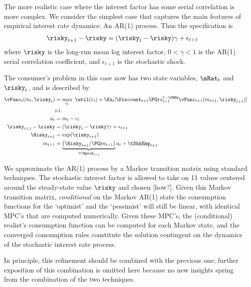 The more realistic case where the interest factor has some serial correlation is more complex.  We consider
the simplest case that captures the main features of empirical interest rate dynamics: An AR(1) process.  Thus
the specification is
\begin{equation}\begin{gathered}\begin{aligned}
  \risky_{t+1}-\risky  & = (\risky_{t}-\risky) \gamma + \epsilon_{t+1}
\end{aligned}\end{gathered}\end{equation}
where $\risky$ is the long-run mean log interest factor, $0 < \gamma < 1$ is the AR(1) serial correlation
coefficient, and $\epsilon_{t+1}$ is the stochastic shock.

The consumer's problem in this case now has two state variables, $\mRat_{t}$ and $\risky_{t}$, and
is described by
\begin{equation}\begin{gathered}\begin{aligned}
        \vFunc_{t}(m_{t},\risky_{t})  & = \max_{{c}_{t}} ~ \util(c_{t})+
        \Ex_{t}[{\Discount}_{t+1}\PGro_{t+1}^{1-\CRRA}\vFunc_{t+1}(m_{t+1},\risky_{t+1})] \label{vtNormRisky}
\\         & \text{s.t.}   \nonumber \\
    a_{t}    & = m_{t}-c_{t} \nonumber
\\      \risky_{t+1}-\risky  & = (\risky_{t}-\risky)\gamma + \epsilon_{t+1} \notag
\\      \Risky_{t+1}  & = \exp(\risky_{t+1}) \notag
\\      m_{t+1}  & = \underbrace{\left(\Risky_{t+1}/\PGro_{t+1}\right)}_{\equiv \Rprod_{t+1}}a_{t}+\tShkEmp_{t+1} \nonumber.
\end{aligned}\end{gathered}\end{equation}


We approximate the AR(1) process by a Markov transition matrix using standard techniques.  The stochastic interest factor is allowed to take
on 11 values centered around the steady-state value $\risky$ and chosen [how?].  Given this Markov transition matrix,
{\it conditional} on the Markov AR(1) state the consumption functions for the `optimist' and the `pessimist' will still be linear,
with identical MPC's that are computed numerically.  Given these MPC's, the (conditional) realist's consumption function can be computed for each Markov state, and the converged consumption rules constitute the solution contingent on the dynamics of the stochastic
interest rate process.

In principle, this refinement should be combined with the previous one;
further exposition of this combination is omitted here because no new
insights spring from the combination of the two techniques.

